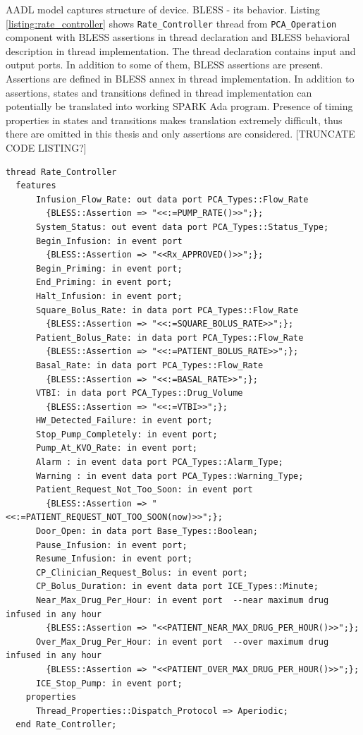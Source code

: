 AADL model captures structure of device. BLESS - its behavior. Listing \ref{listing:rate_controller} shows \lstinline{Rate_Controller} thread from \lstinline{PCA_Operation} component with BLESS assertions in thread declaration and BLESS behavioral description in thread implementation. The thread declaration contains input and output ports. In addition to some of them, BLESS assertions are present. Assertions are defined in BLESS annex in thread implementation. In addition to assertions, states and transitions defined in thread implementation can potentially be translated into working SPARK Ada program. Presence of timing properties in states and transitions makes translation extremely difficult, thus there are omitted in this thesis and only assertions are considered. [TRUNCATE CODE LISTING?]

\singlespacing
\begin{lstlisting}[language=aadl, frame=single, gobble=0, caption={\lstinline{Rate_Controller} thread from \lstinline{PCA_Operation} component with BLESS assertions}]
  thread Rate_Controller
  features
      Infusion_Flow_Rate: out data port PCA_Types::Flow_Rate
        {BLESS::Assertion => "<<:=PUMP_RATE()>>";};   
      System_Status: out event data port PCA_Types::Status_Type;
      Begin_Infusion: in event port
        {BLESS::Assertion => "<<Rx_APPROVED()>>";};  
      Begin_Priming: in event port;
      End_Priming: in event port;
      Halt_Infusion: in event port;
      Square_Bolus_Rate: in data port PCA_Types::Flow_Rate 
        {BLESS::Assertion => "<<:=SQUARE_BOLUS_RATE>>";};
      Patient_Bolus_Rate: in data port PCA_Types::Flow_Rate 
        {BLESS::Assertion => "<<:=PATIENT_BOLUS_RATE>>";};
      Basal_Rate: in data port PCA_Types::Flow_Rate 
        {BLESS::Assertion => "<<:=BASAL_RATE>>";};
      VTBI: in data port PCA_Types::Drug_Volume 
        {BLESS::Assertion => "<<:=VTBI>>";};
      HW_Detected_Failure: in event port;
      Stop_Pump_Completely: in event port; 
      Pump_At_KVO_Rate: in event port; 
      Alarm : in event data port PCA_Types::Alarm_Type;
      Warning : in event data port PCA_Types::Warning_Type;
      Patient_Request_Not_Too_Soon: in event port 
        {BLESS::Assertion => "<<:=PATIENT_REQUEST_NOT_TOO_SOON(now)>>";};  
      Door_Open: in data port Base_Types::Boolean;
      Pause_Infusion: in event port;
      Resume_Infusion: in event port;
      CP_Clinician_Request_Bolus: in event port;
      CP_Bolus_Duration: in event data port ICE_Types::Minute; 
      Near_Max_Drug_Per_Hour: in event port  --near maximum drug infused in any hour
        {BLESS::Assertion => "<<PATIENT_NEAR_MAX_DRUG_PER_HOUR()>>";};  
      Over_Max_Drug_Per_Hour: in event port  --over maximum drug infused in any hour
        {BLESS::Assertion => "<<PATIENT_OVER_MAX_DRUG_PER_HOUR()>>";};  
      ICE_Stop_Pump: in event port;
    properties
      Thread_Properties::Dispatch_Protocol => Aperiodic;
  end Rate_Controller;


\end{lstlisting}
